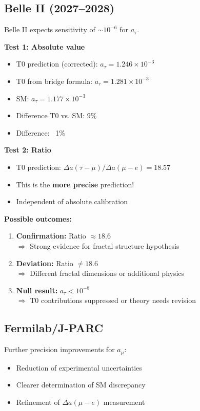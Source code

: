 	\subsection{Belle II (2027--2028)}
	
	Belle II expects sensitivity of $\sim 10^{-6}$ for $a_\tau$.
	
	\textbf{Test 1: Absolute value}
	\begin{itemize}
		\item T0 prediction (corrected): $a_\tau = 1.246 \times 10^{-3}$
		\item T0 from bridge formula: $a_\tau = 1.281 \times 10^{-3}$
		\item SM: $a_\tau = 1.177 \times 10^{-3}$
		\item Difference T0 vs. SM: $9\%$
		\item Difference: ~1\%
	\end{itemize}
	
	\textbf{Test 2: Ratio}
	\begin{itemize}
		\item T0 prediction: $\Delta a(\tau - \mu) / \Delta a(\mu - e) = 18.57$
		\item This is the \textbf{more precise} prediction!
		\item Independent of absolute calibration
	\end{itemize}
	
	\textbf{Possible outcomes:}
	\begin{enumerate}
		\item \textbf{Confirmation:} Ratio $\approx 18.6$ \\
		$\Rightarrow$ Strong evidence for fractal structure hypothesis
		
		\item \textbf{Deviation:} Ratio $\neq 18.6$ \\
		$\Rightarrow$ Different fractal dimensions or additional physics
		
		\item \textbf{Null result:} $a_\tau < 10^{-8}$ \\
		$\Rightarrow$ T0 contributions suppressed or theory needs revision
	\end{enumerate}
	
	\subsection{Fermilab/J-PARC}
	
	Further precision improvements for $a_\mu$:
	\begin{itemize}
		\item Reduction of experimental uncertainties
		\item Clearer determination of SM discrepancy
		\item Refinement of $\Delta a(\mu - e)$ measurement
	\end{itemize}
	
